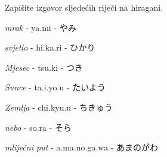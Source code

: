 
\author{Katja Kržišnik, Marko Barbančić}


	\begin{mondai}{Zapišite izgovor sljedećih riječi na hiragani.}
		\item \textit{mrak} - ya.mi - やみ
		\item \textit{svjetlo} - hi.ka.ri - ひかり
		\item \textit{Mjesec} - tsu.ki - つき
		\item \textit{Sunce} - ta.i.yo.u - たいよう
		\item \textit{Zemlja} - chi.kyu.u - ちきゅう
		\item \textit{nebo} - so.ra - そら
		\item \textit{mliječni put} - a.ma.no.ga.wa - あまのがわ
	\end{mondai}

